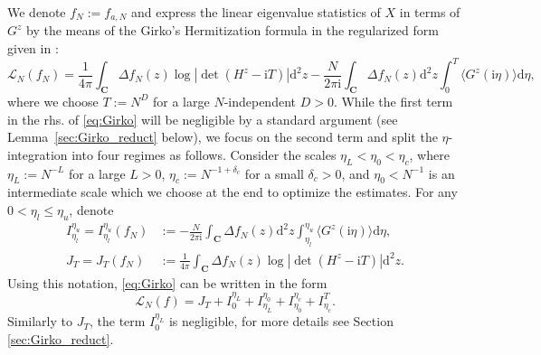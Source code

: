 \documentclass[10pt]{amsart}
\numberwithin{equation}{section}
\newcommand{\dif}{\mathrm{d}}
\newcommand{\C}{\mathbf{C}}
\newcommand{\Lin}{\mathcal{L}}
\newcommand{\ii}{\mathrm{i}}
\begin{document}
We denote $f_N:=f_{a,N}$ and express the linear eigenvalue statistics of $X$ in terms of $G^z$ by the means of the Girko's Hermitization formula \cite{Girko84} in the regularized form given in \cite{TaoVu15}:
\begin{equation}
\Lin_N (f_N)=\frac{1}{4\pi} \int_\C \Delta f_N(z) \log\left\vert \det (H^z-\ii T)\right\vert \dif^2 z - \frac{N}{2\pi\ii} \int_\C \Delta f_N(z)\dif^2 z \int_0^T \langle G^z(\ii\eta)\rangle\dif \eta,
\label{eq:Girko}
\end{equation}
where we choose $T:=N^D$ for a large $N$-independent $D>0$. While the first term in the rhs. of \eqref{eq:Girko} will be negligible by a standard argument (see Lemma~\ref{sec:Girko_reduct} below), we focus on the second term and split the $\eta$-integration into four regimes as follows. Consider the scales $\eta_L<\eta_0<\eta_c$, where $\eta_L:=N^{-L}$ for a large $L>0$, $\eta_c:=N^{-1+\delta_c}$ for a small $\delta_c>0$, and $\eta_0<N^{-1}$ is an intermediate scale which we choose at the end to optimize the estimates. For any $0<\eta_l\le \eta_u$, denote
\begin{equation}
\begin{split}
I_{\eta_l}^{\eta_u}=I_{\eta_l}^{\eta_u}(f_N)&:= - \frac{N}{2\pi\ii} \int_\C \Delta f_N(z)\dif^2 z \int_{\eta_l}^{\eta_u} \langle G^z(\ii\eta)\rangle\dif \eta,\\
J_T=J_T(f_N)&:=\frac{1}{4\pi} \int_\C \Delta f_N(z) \log\left\vert \det (H^z-\ii T)\right\vert \dif^2 z.
\end{split}
\label{eq:def_IJ}
\end{equation}
Using this notation, \eqref{eq:Girko} can be written in the form
\begin{equation}
\Lin_N(f) = J_T + I_0^{\eta_L} + I_{\eta_L}^{\eta_0}+I_{\eta_0}^{\eta_c}+I_{\eta_c}^T.
\label{eq:Girko_I}
\end{equation}
Similarly to $J_T$, the term $I_{0}^{\eta_L}$ is negligible, for more details see Section \ref{sec:Girko_reduct}.
\end{document}
